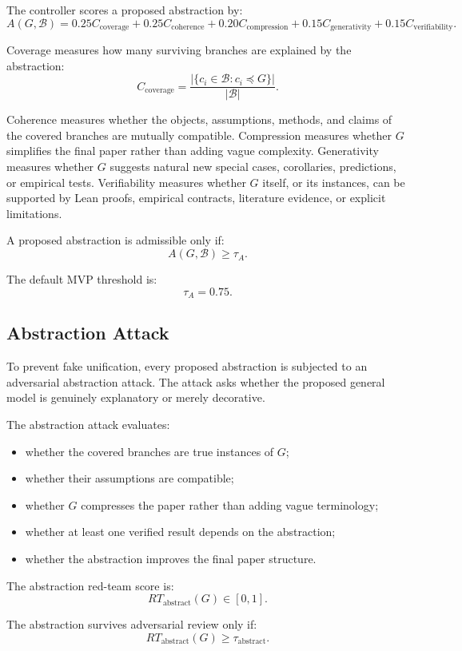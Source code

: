 \documentclass[11pt]{article}
\begin{document}
The controller scores a proposed abstraction by:
$$
A(G,\mathcal{B})
=
0.25C_{\text{coverage}}
+
0.25C_{\text{coherence}}
+
0.20C_{\text{compression}}
+
0.15C_{\text{generativity}}
+
0.15C_{\text{verifiability}}.
$$

Coverage measures how many surviving branches are explained by the abstraction:
$$
C_{\text{coverage}}
=
\frac{|\{c_i\in\mathcal{B}:c_i\preceq G\}|}{|\mathcal{B}|}.
$$

Coherence measures whether the objects, assumptions, methods, and claims of the covered branches are mutually compatible. Compression measures whether $G$ simplifies the final paper rather than adding vague complexity. Generativity measures whether $G$ suggests natural new special cases, corollaries, predictions, or empirical tests. Verifiability measures whether $G$ itself, or its instances, can be supported by Lean proofs, empirical contracts, literature evidence, or explicit limitations.

A proposed abstraction is admissible only if:
$$
A(G,\mathcal{B})\geq \tau_A.
$$

The default MVP threshold is:
$$
\tau_A=0.75.
$$

\subsection{Abstraction Attack}

To prevent fake unification, every proposed abstraction is subjected to an adversarial abstraction attack. The attack asks whether the proposed general model is genuinely explanatory or merely decorative.

The abstraction attack evaluates:
\begin{itemize}[leftmargin=*]
    \item whether the covered branches are true instances of $G$;
    \item whether their assumptions are compatible;
    \item whether $G$ compresses the paper rather than adding vague terminology;
    \item whether at least one verified result depends on the abstraction;
    \item whether the abstraction improves the final paper structure.
\end{itemize}

The abstraction red-team score is:
$$
RT_{\text{abstract}}(G)\in[0,1].
$$

The abstraction survives adversarial review only if:
$$
RT_{\text{abstract}}(G)\geq \tau_{\text{abstract}}.
$$
\end{document}
